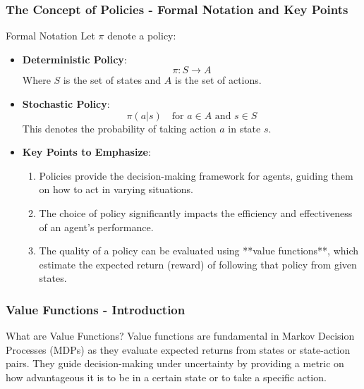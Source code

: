 \documentclass[aspectratio=169]{beamer}
\begin{document}
\begin{frame}[fragile]
    \frametitle{The Concept of Policies - Formal Notation and Key Points}
    \begin{block}{Formal Notation}
        Let \( \pi \) denote a policy:
        \begin{itemize}
            \item \textbf{Deterministic Policy}:
            \begin{equation}
                \pi: S \rightarrow A
            \end{equation}
            Where \( S \) is the set of states and \( A \) is the set of actions.
            \item \textbf{Stochastic Policy}:
            \begin{equation}
                \pi(a|s) \quad \text{for } a \in A \text{ and } s \in S
            \end{equation}
            This denotes the probability of taking action \( a \) in state \( s \).
        \end{itemize}
    \end{block}
    
    \begin{itemize}
        \item \textbf{Key Points to Emphasize}:
        \begin{enumerate}
            \item Policies provide the decision-making framework for agents, guiding them on how to act in varying situations.
            \item The choice of policy significantly impacts the efficiency and effectiveness of an agent's performance.
            \item The quality of a policy can be evaluated using **value functions**, which estimate the expected return (reward) of following that policy from given states.
        \end{enumerate}
    \end{itemize}
\end{frame}

\begin{frame}[fragile]
    \frametitle{Value Functions - Introduction}
    \begin{block}{What are Value Functions?}
        Value functions are fundamental in Markov Decision Processes (MDPs) as they evaluate expected returns from states or state-action pairs. They guide decision-making under uncertainty by providing a metric on how advantageous it is to be in a certain state or to take a specific action.
    \end{block}
\end{frame}
\end{document}
